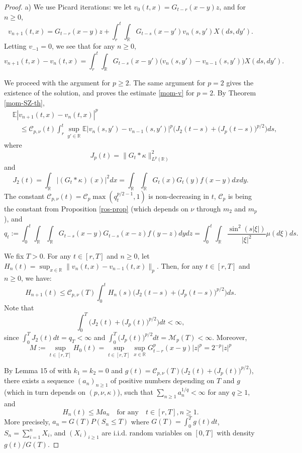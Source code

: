 \documentclass[12pt]{article}
\def\cC{\mathcal{C}}
\def\cM{\mathcal{M}}
\def\bE{\mathbb{E}}
\def\bR{\mathbb{R}}
\def\k{\kappa}
\begin{document}
\begin{proof}
a) We use Picard iterations: we let $v_0(t,x)=G_{t-r}(x-y)z$, and for $n\geq 0$, 
\begin{equation}
\label{def-vn}
v_{n+1}(t,x)=G_{t-r}(x-y)z+\int_r^t \int_{\bR}G_{t-s}(x-y')v_n(s,y')X(ds,dy').
\end{equation}
Letting $v_{-1}=0$, we see that for any $n\geq 0$,
\begin{equation}
\label{Picard-v}
v_{n+1}(t,x)-v_n(t,x)=\int_r^t \int_{\bR}G_{t-s}(x-y')\big(v_n(s,y')-v_{n-1}(s,y')\big) X(ds,dy').
\end{equation}

We proceed with the argument for $p\geq 2$. The same argument for $p=2$ gives the existence of the solution, and proves the estimate \eqref{mom-v} for $p=2$. By Theorem \ref{mom-SZ-th},
\begin{align*}
& \bE|v_{n+1}(t,x)-v_n(t,x)|^p \\
& \quad \leq  \cC_{p,\nu}(t) \int_r^t \sup_{y' \in \bR}\bE|v_n(s,y')-v_{n-1}(s,y')|^p \Big(J_2(t-s)+ \big(J_p(t-s)\big)^{p/2}\Big) ds,
\end{align*}
where 
\[
J_p(t)=\|G_t*\k\|_{L^p(\bR)}^2\]
and
\[
J_2(t)=\int_{\bR}|(G_t*\k)(x)|^2 dx=\int_{\bR}\int_{\bR} G_t(x)G_t(y) f(x-y)dxdy.
\]
The constant  $\cC_{p,\nu}(t)=\cC_p \max(q_t^{p/2-1},1)$ is non-decreasing in $t$, $\cC_p$ is being the constant from Proposition \ref{ros-prop} (which depends on $\nu$ through $m_2$ and $m_p$), and
\[
q_t:=\int_0^t \int_{\bR}\int_{\bR}G_{t-s}(x-y)G_{t-s}(x-z)f(y-z)dydz =\int_0^t \int_{\bR}\frac{\sin^2(s|\xi|)}{|\xi|^2}\mu(d\xi)ds.
\]

We fix $T>0$. For any $t\in [r,T]$ and $n\geq 0$, let $H_n(t)=\sup_{x\in \bR}\|v_n(t,x)-v_{n-1}(t,x)\|_p$. 
Then, for any $t \in [r,T]$ and $n\geq 0$, we have:
\[
H_{n+1}(t) \leq \cC_{p,\nu}(T)\int_0^t H_n(s)\Big(J_2(t-s)+ \big(J_p(t-s)\big)^{p/2}\Big) ds.
\]
Note that
\[
\int_0^T \Big(J_2(t)+ \big(J_p(t)\big)^{p/2}\Big) dt<\infty,
\]
since $\int_0^T J_2(t)dt=q_T<\infty$ and $\int_0^T \big(J_p(t)\big)^{p/2} dt=\cM_p(T)<\infty$. Moreover, 
\[
M:=\sup_{t \in [r,T]}H_0(t) =\sup_{t \in [r,T]} \sup_{x\in \bR}G_{t-r}^p(x-y)|z|^p=2^{-p}|z|^p
\]

By Lemma 15 of \cite{dalang99} with $k_1=k_2=0$ and  $g(t)=\cC_{p,\nu}(T)\big(J_2(t)+ \big(J_p(t)\big)^{p/2}\big)$, there exists a sequence $(a_n)_{n\geq 1}$ of positive numbers depending on $T$ and $g$ (which in turn depends on $(p,\nu,\k)$), such that $\sum_{n\geq 1}a_n^{1/q}<\infty$ for any $q\geq 1$, and
\[
H_n(t) \leq M a_n \quad \mbox{for any} \quad t \in [r,T],n\geq 1.
\]
More precisely, $a_n=G(T)P(S_n\leq T)$ where $G(T)=\int_0^T g(t)dt$, $S_n=\sum_{i=1}^n X_i$, and $(X_i)_{i\geq 1}$ are i.i.d. random variables on $[0,T]$ with density $g(t)/G(T)$. 



\end{proof}
\end{document}
